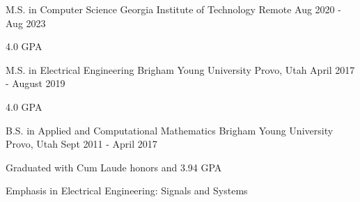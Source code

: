 

\begin{cventries}
  \cventry
    {M.S. in Computer Science} %
    {Georgia Institute of Technology} %
    {Remote} %
    {Aug 2020 - Aug 2023} %
    {
      \begin{cvitems}
        \item {4.0 GPA}
      \end{cvitems}
    }

  \cventry
    {M.S. in Electrical Engineering} %
    {Brigham Young University} %
    {Provo, Utah} %
    {April 2017 - August 2019} %
    {
      \begin{cvitems}
        \item {4.0 GPA}
      \end{cvitems}
    }

  \cventry
    {B.S. in Applied and Computational Mathematics} %
    {Brigham Young University} %
    {Provo, Utah} %
    {Sept 2011 - April 2017} %
    {
      \begin{cvitems} %
        \item {Graduated with Cum Laude honors and 3.94 GPA}
        \item {Emphasis in Electrical Engineering: Signals and Systems}
      \end{cvitems}
    }

\end{cventries}
